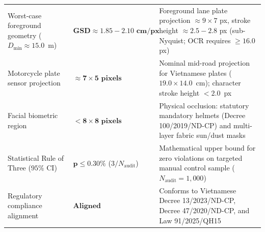 \begin{table}[!htbp]
\begin{tabularx}{\textwidth}{@{} >{\raggedright\arraybackslash}p{5.2cm} >{\raggedright\arraybackslash}p{3.8cm} >{\raggedright\arraybackslash}X @{}}
\addlinespace[2pt]
Worst-case foreground geometry ($D_{\min} \approx 15.0$~m) & $\mathbf{\text{GSD} \approx 1.85 - 2.10\text{ cm/px}}$ & Foreground lane plate projection $\approx 9 \times 7$ px, stroke height $\approx 2.5 - 2.8$ px (sub-Nyquist; OCR requires $\ge 16.0$ px) \\
\addlinespace[2pt]
Motorcycle plate sensor projection & $\mathbf{\approx 7 \times 5\text{ pixels}}$ & Nominal mid-road projection for Vietnamese plates ($19.0 \times 14.0$~cm); character stroke height $< 2.0$~px \\
\addlinespace[2pt]
Facial biometric region & $\mathbf{< 8 \times 8\text{ pixels}}$ & Physical occlusion: statutory mandatory helmets (Decree 100/2019/ND-CP) and multi-layer fabric sun/dust masks \\
\addlinespace[2pt]
Statistical Rule of Three ($95\%$ CI) & $\mathbf{p \le 0.30\%}$ ($3/N_{\text{audit}}$) & Mathematical upper bound for zero violations on targeted manual control sample ($N_{\text{audit}} = 1,000$) \\
\addlinespace[2pt]
Regulatory compliance alignment & $\mathbf{Aligned}$ & Conforms to Vietnamese Decree 13/2023/ND-CP, Decree 47/2020/ND-CP, and Law 91/2025/QH15 \\
\bottomrule
\end{tabularx}
\end{table}
